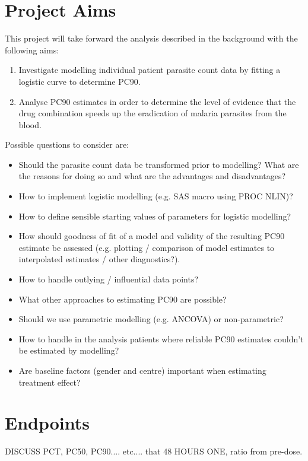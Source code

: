 \section*{Project Aims} 
This project will take forward the analysis described in the background with the following aims:
\begin{enumerate} 
\item Investigate modelling individual patient parasite count data by fitting a logistic curve to determine PC90. 
\item Analyse PC90 estimates in order to determine the level of evidence that the drug combination speeds up the eradication of malaria parasites from the blood.
\end{enumerate} 
Possible questions to consider are: 
\begin{itemize}
\item Should the parasite count data be transformed prior to modelling? What are the reasons for doing so and what are the advantages and disadvantages? 
\item How to implement logistic modelling (e.g. SAS macro using PROC NLIN)?  
\item How to define sensible starting values of parameters for logistic modelling? 
\item How should goodness of fit of a model and validity of the resulting PC90 estimate be assessed (e.g. plotting / comparison of model estimates to interpolated estimates / other diagnostics?). 
\item How to handle outlying / influential data points? 
\item What other approaches to estimating PC90 are possible? 
\item Should we use parametric modelling (e.g. ANCOVA) or non-parametric? 
\item How to handle in the analysis patients where reliable PC90 estimates couldn't be estimated by modelling? 
\item Are baseline factors (gender and centre) important when estimating treatment effect? 
\end{itemize}
\section{Endpoints}
DISCUSS PCT, PC50, PC90.... etc.... that 48 HOURS ONE, ratio from pre-dose.
